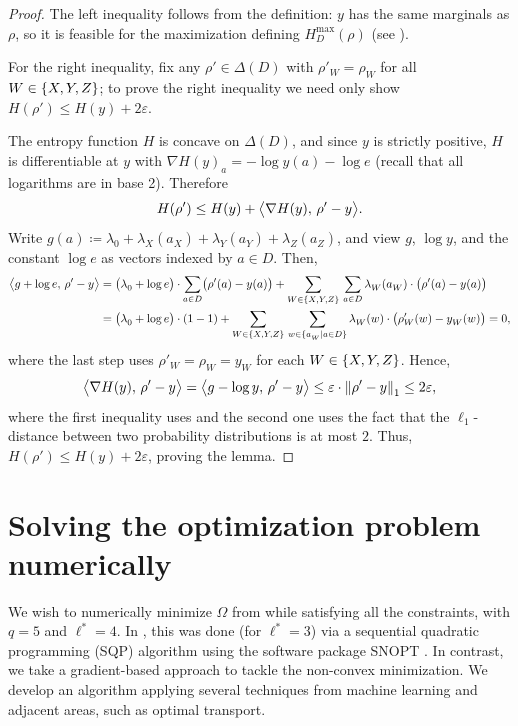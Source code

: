 \documentclass[11pt, a4paper, copyright, gdm]{google}
\theoremstyle{definition}
\theoremstyle{remark}
\theoremstyle{plain}
\newcommand{\defeq}{\coloneqq}
\DeclarePairedDelimiter{\bk}{(}{)}
\DeclarePairedDelimiter{\BK}{\{}{\}}
\newcommand{\eps}{\varepsilon}
\DeclarePairedDelimiter{\angbk}{\langle}{\rangle}
\begin{document}
\begin{proof}
The left inequality follows from the definition: $y$ has the same marginals as $\rho$, so it is feasible for the maximization defining $H_D^{\max}(\rho)$ (see ).

For the right inequality, fix any $\rho' \in \Delta(D)$ with $\rho'_W = \rho_W^{}$ for all $W \in \BK{X, Y, Z}$; to prove the right inequality we need only show $H(\rho') \le H(y) + 2 \eps$.

The entropy function $H$ is concave on $\Delta(D)$, and since $y$ is strictly positive, $H$ is differentiable at $y$ with $\nabla H(y)_a = -\log y(a) - \log e$ (recall that all logarithms are in base 2). Therefore
  \[
    H(\rho') \le H(y) + \angbk[\big]{\nabla H(y), \, \rho' - y}.
  \]
  Write $g(a) \defeq \lambda_0^{} + \lambda_X^{}(a_X^{}) + \lambda_Y^{}(a_Y^{}) + \lambda_Z^{}(a_Z^{})$, and view $g$, $\log y$, and the constant $\log e$ as vectors indexed by $a \in D$.
  Then,
  \begin{align*}
    \angbk[\big]{g + \log e, \, \rho' - y}
     & = \bk[\big]{\lambda_0^{} + \log e} \cdot \sum_{a \in D} \bk[\big]{\rho'(a) - y(a)}
    + \sum_{W \in \BK{X, Y, Z}} \, \sum_{a \in D} \lambda_W^{}(a_W^{}) \cdot \bk[\big]{\rho'(a) - y(a)} \\
     & = \bk[\big]{\lambda_0^{} + \log e} \cdot \bk{1 - 1}
    + \sum_{W \in \BK{X, Y, Z}} \, \sum_{w \in \BK{a_W^{} \mid a \in D}} \lambda_W^{}(w) \cdot \bk[\big]{\rho'_W(w) - y_W^{}(w)}
    = 0,
  \end{align*}
  where the last step uses $\rho'_W = \rho_W^{} = y_W^{}$ for each $W \in \BK{X, Y, Z}$. Hence,
  \[
    \angbk[\big]{\nabla H(y), \, \rho' - y}
    = \angbk[\big]{g - \log y, \, \rho' - y}
    \le \eps \cdot \norm{\rho' - y}_1
    \le 2 \eps,
  \]
  where the first inequality uses  and the second one uses the fact that the $\ell_1$-distance between two probability distributions is at most $2$. Thus, $H(\rho') \le H(y) + 2 \eps$, proving the lemma.
\end{proof}

\section{Solving the optimization problem numerically}
\label{app:subsubsec:omega_optimization}

We wish to numerically minimize $\Omega$ from  while satisfying all the constraints, with $q=5$ and $\ell^*=4$. In \cite{alman2025more}, this was done (for $\ell^*=3$) via a sequential quadratic programming (SQP) algorithm using the software package SNOPT \citep{gill2022snopt}. In contrast, we take a gradient-based approach to tackle the non-convex minimization. We develop an algorithm applying several techniques from machine learning and adjacent areas, such as optimal transport.
\end{document}
